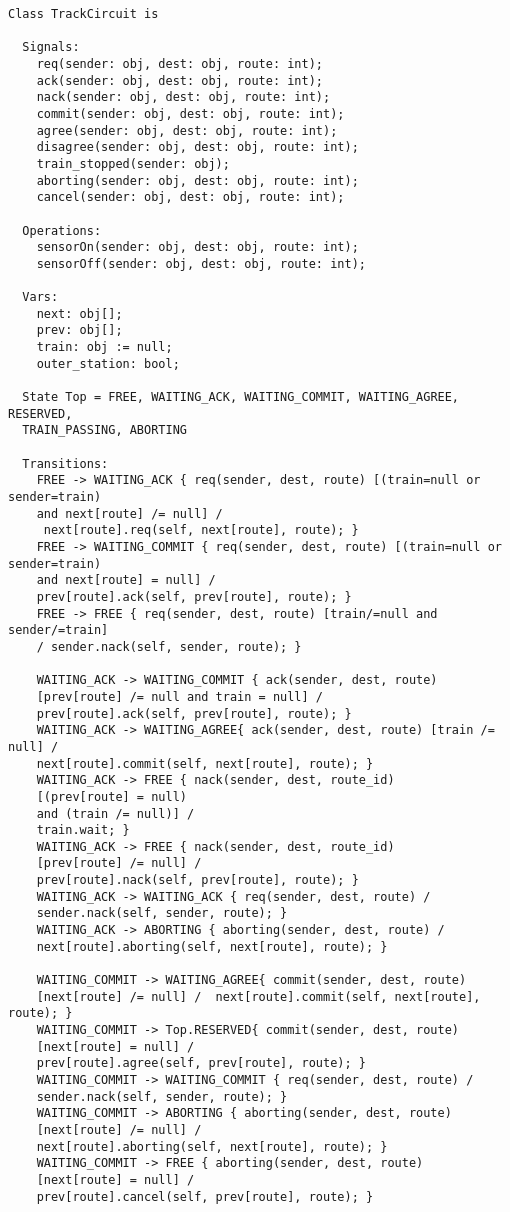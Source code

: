 \begin{lstlisting}[caption={modello della classe TrackCircuit}]
Class TrackCircuit is

  Signals:
    req(sender: obj, dest: obj, route: int);        
    ack(sender: obj, dest: obj, route: int);
    nack(sender: obj, dest: obj, route: int);
    commit(sender: obj, dest: obj, route: int);
    agree(sender: obj, dest: obj, route: int);
    disagree(sender: obj, dest: obj, route: int);
    train_stopped(sender: obj);
    aborting(sender: obj, dest: obj, route: int);
    cancel(sender: obj, dest: obj, route: int);

  Operations:
    sensorOn(sender: obj, dest: obj, route: int);
    sensorOff(sender: obj, dest: obj, route: int);

  Vars:
    next: obj[];
    prev: obj[];
    train: obj := null;
    outer_station: bool;

  State Top = FREE, WAITING_ACK, WAITING_COMMIT, WAITING_AGREE, RESERVED, 
  TRAIN_PASSING, ABORTING

  Transitions:
    FREE -> WAITING_ACK { req(sender, dest, route) [(train=null or sender=train) 
    and next[route] /= null] /
     next[route].req(self, next[route], route); }
    FREE -> WAITING_COMMIT { req(sender, dest, route) [(train=null or sender=train) 
    and next[route] = null] / 
    prev[route].ack(self, prev[route], route); }
    FREE -> FREE { req(sender, dest, route) [train/=null and sender/=train] 
    / sender.nack(self, sender, route); }

    WAITING_ACK -> WAITING_COMMIT { ack(sender, dest, route) 
    [prev[route] /= null and train = null] / 
    prev[route].ack(self, prev[route], route); }
    WAITING_ACK -> WAITING_AGREE{ ack(sender, dest, route) [train /= null] / 
    next[route].commit(self, next[route], route); }
    WAITING_ACK -> FREE { nack(sender, dest, route_id) 
    [(prev[route] = null) 
    and (train /= null)] / 
    train.wait; }
    WAITING_ACK -> FREE { nack(sender, dest, route_id) 
    [prev[route] /= null] / 
    prev[route].nack(self, prev[route], route); }
    WAITING_ACK -> WAITING_ACK { req(sender, dest, route) / 
    sender.nack(self, sender, route); }
    WAITING_ACK -> ABORTING { aborting(sender, dest, route) / 
    next[route].aborting(self, next[route], route); }

    WAITING_COMMIT -> WAITING_AGREE{ commit(sender, dest, route) 
    [next[route] /= null] /  next[route].commit(self, next[route], route); }
    WAITING_COMMIT -> Top.RESERVED{ commit(sender, dest, route) 
    [next[route] = null] / 
    prev[route].agree(self, prev[route], route); }
    WAITING_COMMIT -> WAITING_COMMIT { req(sender, dest, route) / 
    sender.nack(self, sender, route); }
    WAITING_COMMIT -> ABORTING { aborting(sender, dest, route) 
    [next[route] /= null] / 
    next[route].aborting(self, next[route], route); }
    WAITING_COMMIT -> FREE { aborting(sender, dest, route) 
    [next[route] = null] / 
    prev[route].cancel(self, prev[route], route); }


\end{lstlisting}
